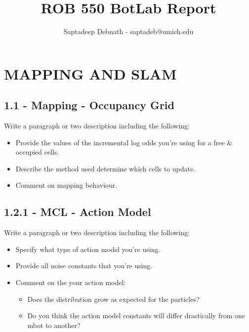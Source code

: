 \documentclass[journal,onecolumn]{IEEEtran}
\begin{document}
\title{%
  ROB 550 BotLab Report \\
  }
    
\author{Saptadeep Debnath - saptadeb@umich.edu}

\maketitle

\IEEEpeerreviewmaketitle

\section{MAPPING AND SLAM}

\subsection*{1.1 - Mapping - Occupancy Grid} 

Write a paragraph or two description including the following:

\begin{itemize}
    \item Provide the values of the incremental log odds you're using for a free \& occupied cells.
    \item Describe the method used determine which cells to update.
    \item Comment on mapping behaviour.
\end{itemize}



\subsection*{1.2.1 - MCL - Action Model} 

 Write a paragraph or two description including the following:
 \begin{itemize}
    \item Specify what type of action model you're using.
    \item Provide all noise constants that you're using.
    \item Comment on the your action model:
        \begin{itemize}
            \item Does the distribution grow as expected for the particles?
            \item Do you think the action model constants will differ drastically from one
mbot to another?
        \end{itemize}
\end{itemize}
\end{document}
